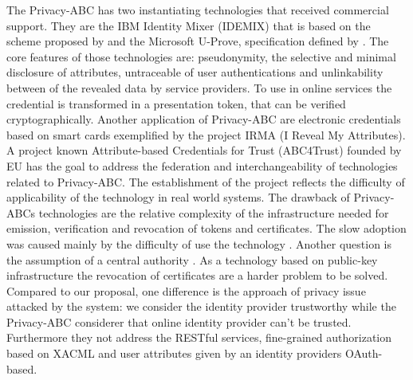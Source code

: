 \documentclass{doublecol-new}
\begin{document}
The Privacy-ABC has two instantiating technologies that received commercial support. They are the IBM Identity Mixer (IDEMIX)\citep{camenisch2002design} that is based on the scheme proposed by \cite{camenisch2001efficient} and the Microsoft U-Prove, specification defined by \cite{brands2000rethinking}. The core features of those technologies are: pseudonymity, the selective and minimal disclosure of attributes, untraceable of user authentications and unlinkability between of the revealed data by service providers. To use in online services the credential is transformed in a presentation token, that can be verified cryptographically. Another application of Privacy-ABC are electronic credentials based on smart cards exemplified by the project IRMA (I Reveal My Attributes)\citep{koning2014abc}. A project known Attribute-based Credentials for Trust (ABC4Trust) founded by EU has the goal to address the federation and interchangeability of technologies related to Privacy-ABC. The establishment of the project reflects the difficulty of applicability of the technology in real world systems. The drawback of Privacy-ABCs technologies are the relative complexity \citep{nogueira2014aprimoramento} of the infrastructure needed for emission, verification and revocation of tokens and certificates. The slow adoption was caused mainly by the difficulty of use the technology \citep{camenisch2012language}. Another question is the assumption of a central authority \citep{bertino2011identity}. As a technology based on public-key infrastructure the revocation of certificates are a harder problem to be solved. Compared to our proposal, one difference is the approach of privacy issue attacked by the system: we consider the identity provider trustworthy while the Privacy-ABC considerer that online identity provider can't be trusted. Furthermore they not address the RESTful services, fine-grained authorization based on XACML and user attributes given by an identity providers OAuth-based.
\end{document}
